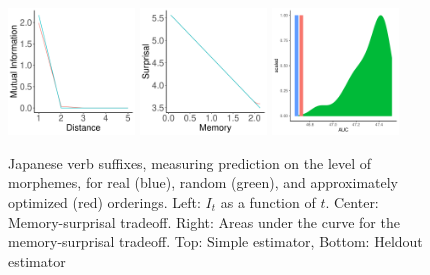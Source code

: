 \documentclass[11pt,letterpaper]{article}
\begin{document}
\begin{figure}
\begin{center}
		\includegraphics[width=0.3\textwidth]{figures/Japanese-suffixes-byMorphemes-it-heldout.pdf}
		\includegraphics[width=0.3\textwidth]{figures/Japanese-suffixes-byMorphemes-memsurp-heldout.pdf}
		\includegraphics[width=0.3\textwidth]{figures/Japanese-suffixes-byMorphemes-auc-hist-heldout.pdf}
\end{center}
	\caption{Japanese verb suffixes, measuring prediction on the level of morphemes, for real (blue), random (green), and approximately optimized (red) orderings. Left: $I_t$ as a function of $t$. Center: Memory-surprisal tradeoff. Right: Areas under the curve for the memory-surprisal tradeoff. Top: Simple estimator, Bottom: Heldout estimator}\label{fig:jap-morph}
\end{figure}
\end{document}
